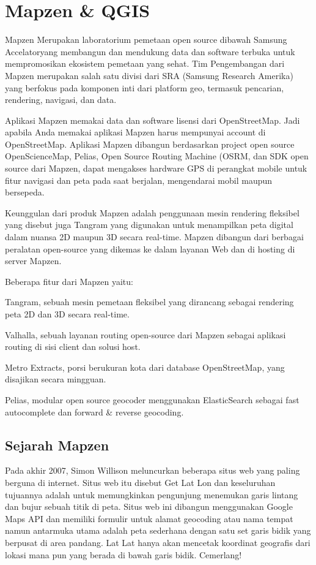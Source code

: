 \section{Mapzen & QGIS}
Mapzen Merupakan laboratorium pemetaan open source dibawah Samsung Accelatoryang membangun dan mendukung data dan software terbuka untuk mempromosikan ekosistem pemetaan yang sehat. Tim Pengembangan dari Mapzen merupakan salah satu divisi dari SRA (Samsung Research Amerika) yang berfokus pada komponen inti dari platform geo, termasuk pencarian, rendering, navigasi, dan data.

Aplikasi Mapzen memakai data dan software lisensi dari OpenStreetMap. Jadi apabila Anda memakai aplikasi Mapzen harus mempunyai account di OpenStreetMap. Aplikasi Mapzen dibangun berdasarkan project open source OpenScienceMap, Pelias, Open Source Routing Machine (OSRM, dan SDK open source dari Mapzen, dapat mengakses hardware GPS di perangkat mobile untuk fitur navigasi dan peta pada saat berjalan, mengendarai mobil maupun bersepeda.

Keunggulan dari produk Mapzen adalah penggunaan mesin rendering fleksibel yang disebut juga Tangram yang digunakan untuk menampilkan peta digital dalam nuansa 2D maupun 3D secara real-time. Mapzen dibangun dari berbagai peralatan open-source yang dikemas ke dalam layanan Web dan di hosting di server Mapzen.

Beberapa fitur  dari Mapzen yaitu:
\item Tangram, sebuah mesin pemetaan fleksibel yang dirancang sebagai rendering peta 2D dan 3D secara real-time.
\item Valhalla, sebuah layanan routing open-source dari Mapzen sebagai aplikasi routing di sisi client dan solusi host.
\item Metro Extracts, porsi berukuran kota dari database OpenStreetMap, yang disajikan secara mingguan.
\item Pelias, modular open source geocoder menggunakan ElasticSearch sebagai fast autocomplete dan forward & reverse geocoding.

\subsection{Sejarah Mapzen}
Pada akhir 2007, Simon Willison meluncurkan beberapa situs web yang paling berguna di internet. Situs web itu disebut Get Lat Lon dan keseluruhan tujuannya adalah untuk memungkinkan pengunjung menemukan garis lintang dan bujur sebuah titik di peta.
Situs web ini dibangun menggunakan Google Maps API dan memiliki formulir untuk alamat geocoding atau nama tempat namun antarmuka utama adalah peta sederhana dengan satu set garis bidik yang berpusat di area pandang. Lat Lat hanya akan mencetak koordinat geografis dari lokasi mana pun yang berada di bawah garis bidik. Cemerlang!

